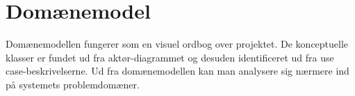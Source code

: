 \section{Domænemodel}
\label{sec:Domainmodel}

Domænemodellen fungerer som en visuel ordbog over projektet. De konceptuelle klasser er fundet ud fra aktør-diagrammet og desuden identificeret ud fra use case-beskrivelserne. Ud fra domænemodellen kan man analysere sig nærmere ind på systemets problemdomæner.

